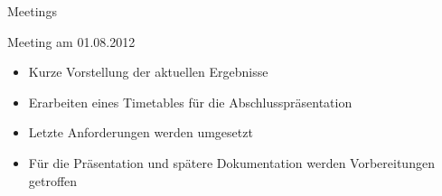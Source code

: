 \begin{frame}{Meetings}
\begin{block}{Meeting am 01.08.2012}
\begin{itemize}[<+->]
\pause\item Kurze Vorstellung der aktuellen Ergebnisse
\item Erarbeiten eines Timetables für die Abschlusspräsentation
\item Letzte Anforderungen werden umgesetzt
\item Für die Präsentation und spätere Dokumentation werden Vorbereitungen getroffen
\end{itemize}
\end{block}
\end{frame}